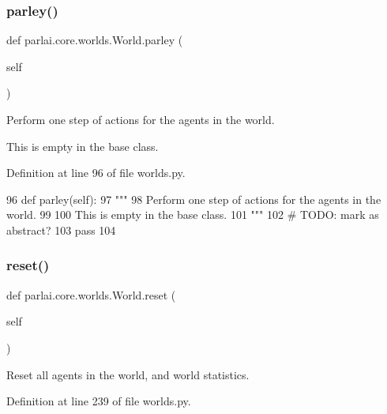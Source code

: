 \subsubsection{\texorpdfstring{parley()}{parley()}}
{\footnotesize\ttfamily def parlai.\+core.\+worlds.\+World.\+parley (\begin{DoxyParamCaption}\item[{}]{self }\end{DoxyParamCaption})}

\begin{DoxyVerb}Perform one step of actions for the agents in the world.

This is empty in the base class.
\end{DoxyVerb}
 

Definition at line 96 of file worlds.\+py.


\begin{DoxyCode}
96     \textcolor{keyword}{def }parley(self):
97         \textcolor{stringliteral}{"""}
98 \textcolor{stringliteral}{        Perform one step of actions for the agents in the world.}
99 \textcolor{stringliteral}{}
100 \textcolor{stringliteral}{        This is empty in the base class.}
101 \textcolor{stringliteral}{        """}
102         \textcolor{comment}{# TODO: mark as abstract?}
103         \textcolor{keywordflow}{pass}
104 
\end{DoxyCode}
\mbox{\label{classparlai_1_1core_1_1worlds_1_1World_a363cc32add41645e1ba405808fafb5b4}} 
\subsubsection{\texorpdfstring{reset()}{reset()}}
{\footnotesize\ttfamily def parlai.\+core.\+worlds.\+World.\+reset (\begin{DoxyParamCaption}\item[{}]{self }\end{DoxyParamCaption})}

\begin{DoxyVerb}Reset all agents in the world, and world statistics.
\end{DoxyVerb}
 

Definition at line 239 of file worlds.\+py.


